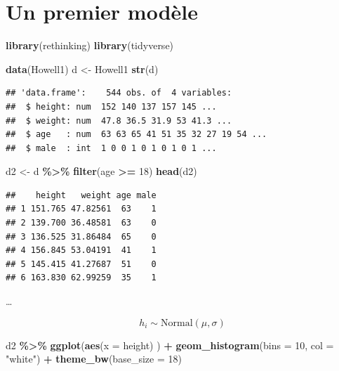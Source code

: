 \documentclass[
  a4paper,11pt,twoside,onecolumn,openright,final,oldfontcommands]{memoir}
\newenvironment{Shaded}{\begin{snugshade}}{\end{snugshade}}
\newcommand{\DataTypeTok}[1]{\textcolor[rgb]{0.13,0.29,0.53}{#1}}
\newcommand{\DecValTok}[1]{\textcolor[rgb]{0.00,0.00,0.81}{#1}}
\newcommand{\KeywordTok}[1]{\textcolor[rgb]{0.13,0.29,0.53}{\textbf{#1}}}
\newcommand{\NormalTok}[1]{#1}
\newcommand{\OperatorTok}[1]{\textcolor[rgb]{0.81,0.36,0.00}{\textbf{#1}}}
\newcommand{\StringTok}[1]{\textcolor[rgb]{0.31,0.60,0.02}{#1}}
\theoremstyle{definition}
\theoremstyle{definition}
\theoremstyle{definition}
\theoremstyle{remark}
\begin{document}
\hypertarget{un-premier-moduxe8le}{%
\section{Un premier modèle}\label{un-premier-moduxe8le}}

\begin{Shaded}
\begin{Highlighting}[]
\KeywordTok{library}\NormalTok{(rethinking)}
\KeywordTok{library}\NormalTok{(tidyverse)}

\KeywordTok{data}\NormalTok{(Howell1)}
\NormalTok{d \textless{}{-}}\StringTok{ }\NormalTok{Howell1}
\KeywordTok{str}\NormalTok{(d)}
\end{Highlighting}
\end{Shaded}

\begin{verbatim}
## 'data.frame':    544 obs. of  4 variables:
##  $ height: num  152 140 137 157 145 ...
##  $ weight: num  47.8 36.5 31.9 53 41.3 ...
##  $ age   : num  63 63 65 41 51 35 32 27 19 54 ...
##  $ male  : int  1 0 0 1 0 1 0 1 0 1 ...
\end{verbatim}

\begin{Shaded}
\begin{Highlighting}[]
\NormalTok{d2 \textless{}{-}}\StringTok{ }\NormalTok{d }\OperatorTok{\%\textgreater{}\%}\StringTok{ }\KeywordTok{filter}\NormalTok{(age }\OperatorTok{\textgreater{}=}\StringTok{ }\DecValTok{18}\NormalTok{)}
\KeywordTok{head}\NormalTok{(d2)}
\end{Highlighting}
\end{Shaded}

\begin{verbatim}
##    height   weight age male
## 1 151.765 47.82561  63    1
## 2 139.700 36.48581  63    0
## 3 136.525 31.86484  65    0
## 4 156.845 53.04191  41    1
## 5 145.415 41.27687  51    0
## 6 163.830 62.99259  35    1
\end{verbatim}

\ldots{}

\[h_{i} \sim \mathrm{Normal}(\mu, \sigma)\]

\begin{Shaded}
\begin{Highlighting}[]
\NormalTok{d2 }\OperatorTok{\%\textgreater{}\%}
\StringTok{    }\KeywordTok{ggplot}\NormalTok{(}\KeywordTok{aes}\NormalTok{(}\DataTypeTok{x =}\NormalTok{ height) ) }\OperatorTok{+}
\StringTok{    }\KeywordTok{geom\_histogram}\NormalTok{(}\DataTypeTok{bins =} \DecValTok{10}\NormalTok{, }\DataTypeTok{col =} \StringTok{"white"}\NormalTok{) }\OperatorTok{+}
\StringTok{    }\KeywordTok{theme\_bw}\NormalTok{(}\DataTypeTok{base\_size =} \DecValTok{18}\NormalTok{)}
\end{Highlighting}
\end{Shaded}
\end{document}
